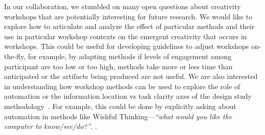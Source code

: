 In our collaboration, we stumbled on many open questions about creativity workshops that are potentially interesting for future research. We would like to explore how to articulate and analyze the effect of particular methods and their use in particular workshop contexts on the emergent creativity that occurs in workshops. This could be useful for developing guidelines to adjust workshops on-the-fly, for example, by adapting methods if levels of engagement among participant are too low or too high, methods take more or less time than anticipated or the artifacts being produced are not useful. We are also interested in understanding how workshop methods can be used to explore the role of automation or the information location vs task clarity axes of the design study methodology~\cite{Sedlmair2012}. For example, this could be done by explicitly asking about automation in methods like Wishful Thinking---\emph{``what would you like the computer to know/see/do?''}. . 



